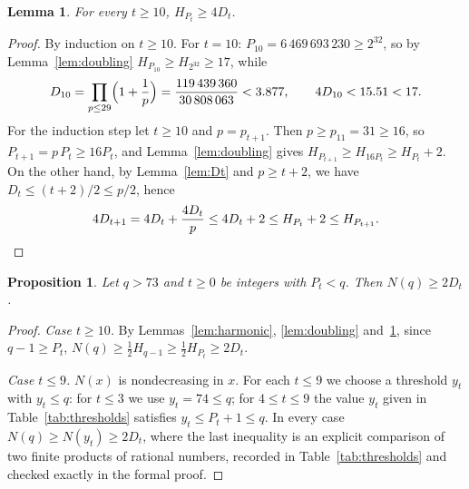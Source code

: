\documentclass[11pt,a4paper]{amsart}
\newtheorem{lemma}[theorem]{Lemma}
\newtheorem{proposition}[theorem]{Proposition}
\theoremstyle{definition}
\theoremstyle{remark}
\begin{document}
\begin{lemma}\label{lem:star}
For every $t\ge 10$, $H_{P_t} \ge 4D_t$.
\end{lemma}

\begin{proof}
By induction on $t\ge10$. For $t=10$: $P_{10} = 6\,469\,693\,230 \ge 2^{32}$, so by Lemma~\ref{lem:doubling} $H_{P_{10}} \ge H_{2^{32}} \ge 17$, while
\[
  D_{10} = \prod_{p\le 29}\Bigl(1+\frac1p\Bigr) = \frac{119\,439\,360}{30\,808\,063} < 3.877,
  \qquad 4D_{10} < 15.51 < 17 .
\]
For the induction step let $t\ge10$ and $p = p_{t+1}$. Then $p \ge p_{11} = 31 \ge 16$, so $P_{t+1} = p\,P_t \ge 16P_t$, and Lemma~\ref{lem:doubling} gives $H_{P_{t+1}} \ge H_{16P_t} \ge H_{P_t}+2$. On the other hand, by Lemma~\ref{lem:Dt} and $p\ge t+2$, we have $D_t \le (t+2)/2 \le p/2$, hence
\[
  4D_{t+1} = 4D_t + \frac{4D_t}{p} \le 4D_t + 2 \le H_{P_t}+2 \le H_{P_{t+1}} . \qedhere
\]
\end{proof}

\begin{proposition}\label{prop:Nq}
Let $q>73$ and $t\ge0$ be integers with $P_t<q$. Then $N(q)\ge 2D_t$.
\end{proposition}

\begin{proof}
\emph{Case $t\ge10$.} By Lemmas~\ref{lem:harmonic}, \ref{lem:doubling} and~\ref{lem:star}, since $q-1\ge P_t$,
$N(q) \ge \tfrac12H_{q-1} \ge \tfrac12 H_{P_t} \ge 2D_t$.

\emph{Case $t\le 9$.} $N(x)$ is nondecreasing in $x$. For each $t\le9$ we choose a threshold $y_t$ with $y_t\le q$: for $t \le 3$ we use $y_t = 74 \le q$; for $4\le t\le9$ the value $y_t$ given in Table~\ref{tab:thresholds} satisfies $y_t\le P_t+1\le q$. In every case $N(q)\ge N(y_t)\ge 2D_t$, where the last inequality is an explicit comparison of two finite products of rational numbers, recorded in Table~\ref{tab:thresholds} and checked exactly in the formal proof.
\end{proof}
\end{document}
